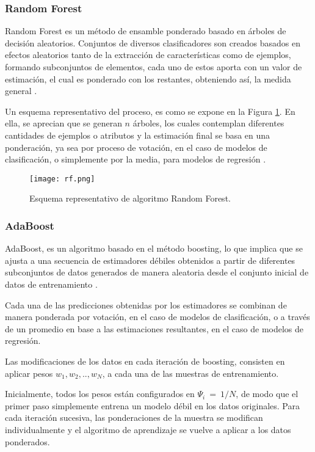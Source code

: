 \subsubsection{Random Forest \label{rf}}

Random Forest es un método de ensamble ponderado basado en árboles de decisión aleatorios. Conjuntos de diversos clasificadores son creados basados en efectos aleatorios tanto de la extracción de características como de ejemplos, formando subconjuntos de elementos, cada uno de estos aporta con un valor de estimación, el cual es ponderado con los restantes, obteniendo así, la medida general \cite{breiman1998}.

Un esquema representativo del proceso, es como se expone en la Figura \ref{rf1}. En ella, se aprecian que se generan $n$ árboles, los cuales contemplan diferentes cantidades de ejemplos o atributos y la estimación final se basa en una ponderación, ya sea por proceso de votación, en el caso de modelos de clasificación, o simplemente por la media, para modelos de regresión \cite{Breiman2001}.

\begin{figure}[!h]
	\centering
	\texttt{[image: rf.png]}
	\caption{Esquema representativo de algoritmo Random Forest.}
	\label{rf1}
	
\end{figure}

\subsubsection{AdaBoost}

AdaBoost, es un algoritmo basado en el método boosting, lo que implica que se ajusta a una secuencia de estimadores débiles obtenidos a partir de diferentes subconjuntos de datos generados de manera aleatoria desde el conjunto inicial de datos de entrenamiento \cite{CAO2013745}. 

Cada una de las predicciones obtenidas por los estimadores se combinan de manera ponderada por votación, en el caso de modelos de clasificación, o a través de un promedio en base a las estimaciones resultantes, en el caso de modelos de regresión.

Las modificaciones de los datos en cada iteración de boosting, consisten en aplicar pesos $w_{1},w_{2},..,w_{N}$, a cada una de las muestras de entrenamiento. 

Inicialmente, todos los pesos están configurados en $\Psi_{i}\ =\ 1/N$, de modo que el primer paso simplemente entrena un modelo débil en los datos originales. Para cada iteración sucesiva, las ponderaciones de la muestra se modifican individualmente y el algoritmo de aprendizaje se vuelve a aplicar a los datos ponderados. 

